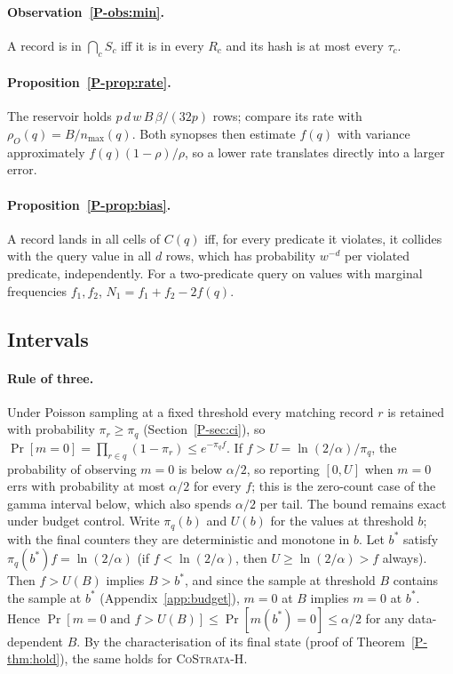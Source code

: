 \documentclass[sigconf,review,anonymous]{acmart}
\newcommand{\csh}{\textsc{CoStrata-H}\xspace}
\newcommand{\pref}[1]{\ref{P-#1}}
\begin{document}
\paragraph{Observation~\pref{obs:min}.} A record is in $\bigcap_cS_c$ iff it is in every $R_c$ and its hash
is at most every $\tau_c$.

\paragraph{Proposition~\pref{prop:rate}.} The reservoir holds $p\,d\,w\,B\,\beta/(32p)$ rows; compare its
rate with $\rho_O(q)=B/n_{\max}(q)$. Both synopses then estimate $f(q)$ with variance approximately
$f(q)(1-\rho)/\rho$, so a lower rate translates directly into a larger error.

\paragraph{Proposition~\pref{prop:bias}.} A record lands in all cells of $C(q)$ iff, for every predicate it
violates, it collides with the query value in all $d$ rows, which has probability $w^{-d}$ per violated
predicate, independently. For a two-predicate query on values with marginal frequencies $f_1,f_2$,
$N_1=f_1+f_2-2f(q)$.

\subsection{Intervals}\label{app:ci}

\paragraph{Rule of three.} Under Poisson sampling at a fixed threshold every matching record $r$ is
retained with probability $\pi_r\ge\pi_q$ (Section~\pref{sec:ci}), so
$\Pr[m=0]=\prod_{r\in q}(1-\pi_r)\le e^{-\pi_qf}$. If $f>U=\ln(2/\alpha)/\pi_q$, the probability of
observing $m=0$ is below $\alpha/2$, so reporting $[0,U]$ when $m=0$ errs with probability at most
$\alpha/2$ for every $f$; this is the zero-count case of the gamma interval below, which also spends
$\alpha/2$ per tail. The bound remains exact under budget control. Write $\pi_q(b)$ and $U(b)$ for the
values at threshold $b$; with the final counters they are deterministic and monotone in $b$. Let $b^*$
satisfy $\pi_q(b^*)f=\ln(2/\alpha)$ (if $f<\ln(2/\alpha)$, then $U\ge\ln(2/\alpha)>f$ always). Then
$f>U(B)$ implies $B>b^*$, and since the sample at threshold $B$ contains the sample at $b^*$
(Appendix~\ref{app:budget}), $m=0$ at $B$ implies $m=0$ at $b^*$. Hence
$\Pr[m=0\text{ and }f>U(B)]\le\Pr[m(b^*)=0]\le\alpha/2$ for any data-dependent $B$. By the
characterisation of its final state (proof of Theorem~\pref{thm:hold}), the same holds for \csh.
\end{document}
